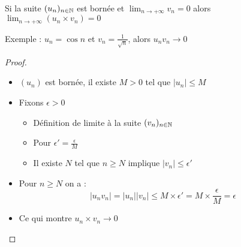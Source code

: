 \begin{frame}
\begin{proposition}
\label{prop:suitebornezero}
Si la suite $(u_n)_{n\in \mathbb{N}}$ est bornée et $\lim_{n\to +\infty}v_n=0$ 
alors \\
\hfil \hfil $\lim_{n\to +\infty}\left(u_n\times v_n\right)=0$
\end{proposition}
\pause
Exemple : $u_n=\cos n$ et $v_n=\frac{1}{\sqrt{n}}$, alors $u_nv_n \to 0$

\pause
\begin{proof}
\begin{itemize}
  \item $(u_n)$ est bornée, il existe $M>0$ tel que  $\lvert u_n \rvert\leq M$
  
\pause  
  \item Fixons $\epsilon >0$
\pause
  \begin{itemize}
    \item Définition de limite à la suite $(v_n)_{n\in \mathbb{N}}$
\pause     
    \item Pour $\epsilon'=\frac{\epsilon}{M}$
\pause     
    \item Il existe  $N$ tel que $n\geq N$ implique $ \lvert v_n  \rvert\leq  \epsilon'$
  \end{itemize}
    
  
\pause 

  \item Pour $n\geq N$ on a :
\[ \lvert u_nv_n \rvert= \lvert u_n \rvert \lvert v_n \rvert \leq M\times \epsilon'=
M\times\frac{\epsilon}{M} =\epsilon\]
  
\pause  
  \item Ce qui montre $u_n\times v_n \to 0$ \qedhere
\end{itemize}

\end{proof}

\end{frame}

